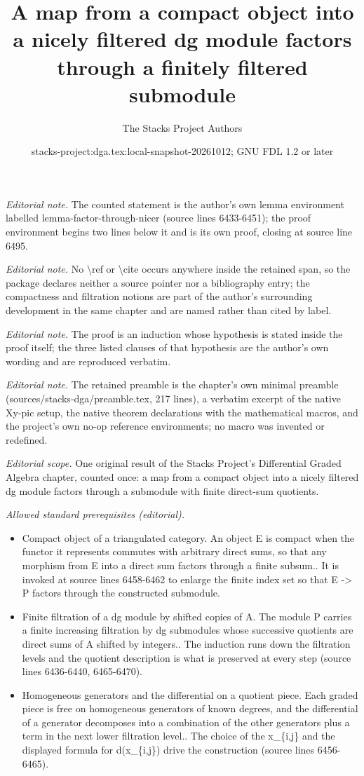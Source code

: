 \documentclass{stacks-project}
\title{A map from a compact object into a nicely filtered dg module factors through a finitely filtered submodule}
\author{The Stacks Project Authors}
\date{stacks-project:dga.tex:local-snapshot-20261012; GNU FDL 1.2 or later}
\theoremstyle{plain}
\theoremstyle{definition}
\theoremstyle{remark}
\numberwithin{equation}{subsection}
\begin{document}
\maketitle
\noindent\textit{Editorial note.} The counted statement is the author's own lemma environment labelled lemma-factor-through-nicer (source lines 6433-6451); the proof environment begins two lines below it and is its own proof, closing at source line 6495.\par\medskip
\noindent\textit{Editorial note.} No \textbackslash{}ref or \textbackslash{}cite occurs anywhere inside the retained span, so the package declares neither a source pointer nor a bibliography entry; the compactness and filtration notions are part of the author's surrounding development in the same chapter and are named rather than cited by label.\par\medskip
\noindent\textit{Editorial note.} The proof is an induction whose hypothesis is stated inside the proof itself; the three listed clauses of that hypothesis are the author's own wording and are reproduced verbatim.\par\medskip
\noindent\textit{Editorial note.} The retained preamble is the chapter's own minimal preamble (sources/stacks-dga/preamble.tex, 217 lines), a verbatim excerpt of the native Xy-pic setup, the native theorem declarations with the mathematical macros, and the project's own no-op reference environments; no macro was invented or redefined.\par\medskip
\noindent\textit{Editorial scope.} One original result of the Stacks Project's Differential Graded Algebra chapter, counted once: a map from a compact object into a nicely filtered dg module factors through a submodule with finite direct-sum quotients.\par\medskip
\noindent\textit{Allowed standard prerequisites (editorial).}\begin{itemize}
\item Compact object of a triangulated category. An object E is compact when the functor it represents commutes with arbitrary direct sums, so that any morphism from E into a direct sum factors through a finite subsum.. It is invoked at source lines 6458-6462 to enlarge the finite index set so that E -> P factors through the constructed submodule.
\item Finite filtration of a dg module by shifted copies of A. The module P carries a finite increasing filtration by dg submodules whose successive quotients are direct sums of A shifted by integers.. The induction runs down the filtration levels and the quotient description is what is preserved at every step (source lines 6436-6440, 6465-6470).
\item Homogeneous generators and the differential on a quotient piece. Each graded piece is free on homogeneous generators of known degrees, and the differential of a generator decomposes into a combination of the other generators plus a term in the next lower filtration level.. The choice of the x\_\{i,j\} and the displayed formula for d(x\_\{i,j\}) drive the construction (source lines 6456-6465).
\end{itemize}\medskip
\end{document}
